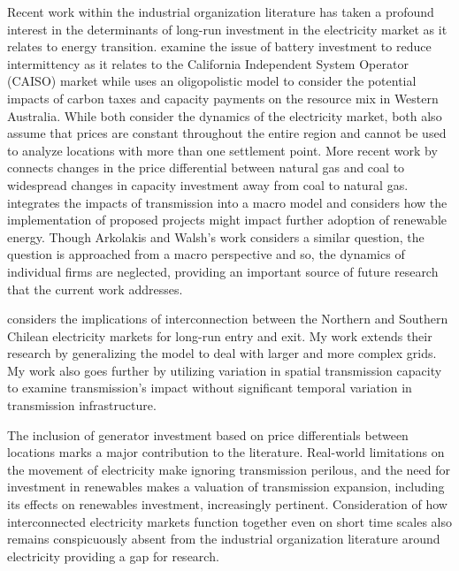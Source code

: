 \documentclass[12pt]{article}
\begin{document}
Recent work within the industrial organization literature has taken a profound interest in the determinants of long-run investment in the electricity market as it relates to energy transition. \cite{butters2021soaking} examine the issue of battery investment to reduce intermittency as it relates to the California Independent System Operator (CAISO) market while \cite{elliott2022investment} uses an oligopolistic model to consider the potential impacts of carbon taxes and capacity payments on the resource mix in Western Australia. While both consider the dynamics of the electricity market, both also assume that prices are constant throughout the entire region and cannot be used to analyze locations with more than one settlement point.  More recent work by \cite{gowrisankaran2024energy} connects changes in the price differential between natural gas and coal to widespread changes in capacity investment away from coal to natural gas. \cite{arkolakis2023clean} integrates the impacts of transmission into a macro model and considers how the implementation of proposed projects might impact further adoption of renewable energy. Though Arkolakis and Walsh's work considers a similar question, the question is approached from a macro perspective and so, the dynamics of individual firms are neglected, providing an important source of future research that the current work addresses. 

\cite{gonzales2022dynamic} considers the implications of interconnection between the Northern and Southern Chilean electricity markets for long-run entry and exit. My work extends their research by generalizing the model to deal with larger and more complex grids. My work also goes further by utilizing variation in spatial transmission capacity to examine transmission's impact without significant temporal variation in transmission infrastructure.

The inclusion of generator investment based on price differentials between locations marks a major contribution to the literature. Real-world limitations on the movement of electricity make ignoring transmission perilous, and the need for investment in renewables makes a valuation of transmission expansion, including its effects on renewables investment, increasingly pertinent. Consideration of how interconnected electricity markets function together even on short time scales also remains conspicuously absent from the industrial organization literature around electricity providing a gap for research. 
\end{document}
